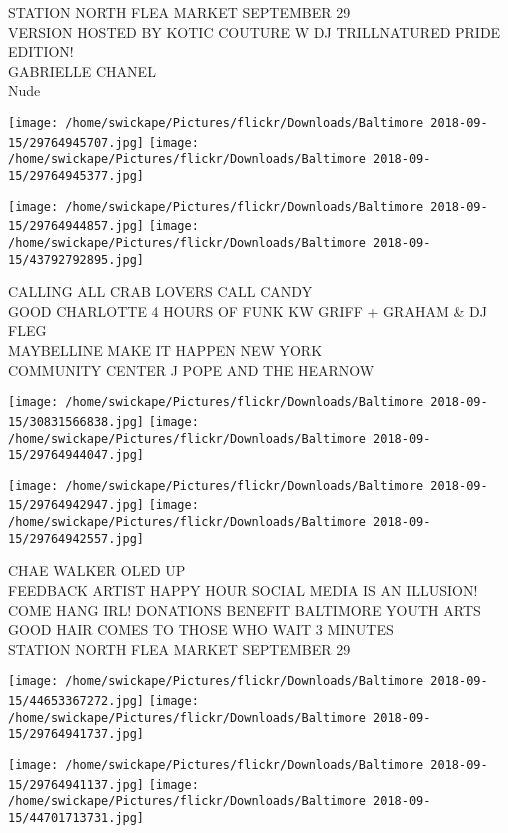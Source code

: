 \documentclass[10pt,letterpaper]{article}
\begin{document}
STATION NORTH FLEA MARKET SEPTEMBER 29\\
VERSION HOSTED BY KOTIC COUTURE W DJ TRILLNATURED PRIDE EDITION!\\
GABRIELLE CHANEL\\
Nude\\
\pagebreak

\texttt{[image: /home/swickape/Pictures/flickr/Downloads/Baltimore 2018-09-15/29764945707.jpg]}
\texttt{[image: /home/swickape/Pictures/flickr/Downloads/Baltimore 2018-09-15/29764945377.jpg]}

\texttt{[image: /home/swickape/Pictures/flickr/Downloads/Baltimore 2018-09-15/29764944857.jpg]}
\texttt{[image: /home/swickape/Pictures/flickr/Downloads/Baltimore 2018-09-15/43792792895.jpg]}

CALLING ALL CRAB LOVERS CALL CANDY\\
GOOD CHARLOTTE 4 HOURS OF FUNK KW GRIFF + GRAHAM \& DJ FLEG\\
MAYBELLINE MAKE IT HAPPEN NEW YORK\\
COMMUNITY CENTER J POPE AND THE HEARNOW\\
\pagebreak

\texttt{[image: /home/swickape/Pictures/flickr/Downloads/Baltimore 2018-09-15/30831566838.jpg]}
\texttt{[image: /home/swickape/Pictures/flickr/Downloads/Baltimore 2018-09-15/29764944047.jpg]}

\texttt{[image: /home/swickape/Pictures/flickr/Downloads/Baltimore 2018-09-15/29764942947.jpg]}
\texttt{[image: /home/swickape/Pictures/flickr/Downloads/Baltimore 2018-09-15/29764942557.jpg]}

CHAE WALKER OLED UP\\
FEEDBACK ARTIST HAPPY HOUR SOCIAL MEDIA IS AN ILLUSION!  COME HANG IRL!  DONATIONS BENEFIT BALTIMORE YOUTH ARTS\\
GOOD HAIR COMES TO THOSE WHO WAIT 3 MINUTES\\
STATION NORTH FLEA MARKET SEPTEMBER 29\\
\pagebreak

\texttt{[image: /home/swickape/Pictures/flickr/Downloads/Baltimore 2018-09-15/44653367272.jpg]}
\texttt{[image: /home/swickape/Pictures/flickr/Downloads/Baltimore 2018-09-15/29764941737.jpg]}

\texttt{[image: /home/swickape/Pictures/flickr/Downloads/Baltimore 2018-09-15/29764941137.jpg]}
\texttt{[image: /home/swickape/Pictures/flickr/Downloads/Baltimore 2018-09-15/44701713731.jpg]}
\end{document}
